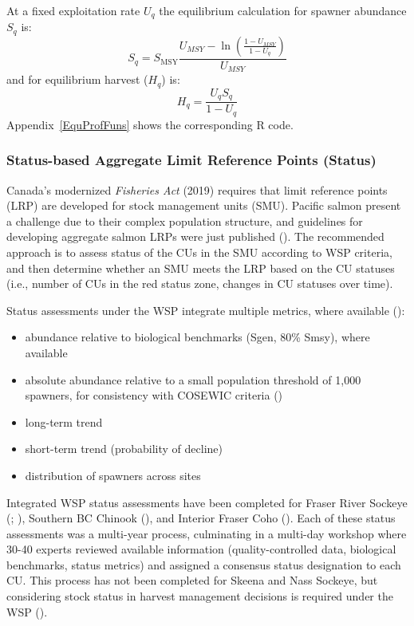 \documentclass[french,11pt]{book}
\begin{document}
At a fixed exploitation rate \(U_q\) the equilibrium calculation for spawner abundance \(S_{q}\) is:
\begin{equation}
S_{q} = S_{\mathrm{MSY}} \frac{U_{MSY} - \ln\left(\frac{1 - U_{MSY}}{1 - U_{q}}\right)}{U_{MSY}}
\end{equation}
and for equilibrium harvest (\(H_{q}\)) is:
\begin{equation}
H_{q} = \frac{U_{q}S_{q}}{1 - U_{q}}
\end{equation}
Appendix~\ref{EquProfFuns} shows the corresponding R code.

\subsubsection{Status-based Aggregate Limit Reference Points (Status)}\label{StatusMethods}

Canada's modernized \emph{Fisheries Act} (2019) requires that limit reference points (LRP) are developed for stock management units (SMU). Pacific salmon present a challenge due to their complex population structure, and guidelines for developing aggregate salmon LRPs were just published (). The recommended approach is to assess status of the CUs in the SMU according to WSP criteria, and then determine whether an SMU meets the LRP based on the CU statuses (i.e., number of CUs in the red status zone, changes in CU statuses over time).

Status assessments under the WSP integrate multiple metrics, where available ():
\begin{itemize}

\item
  abundance relative to biological benchmarks (Sgen, 80\% Smsy), where available
\item
  absolute abundance relative to a small population threshold of 1,000 spawners, for consistency with COSEWIC criteria ()
\item
  long-term trend
\item
  short-term trend (probability of decline)
\item
  distribution of spawners across sites
\end{itemize}
Integrated WSP status assessments have been completed for Fraser River Sockeye (; ), Southern BC Chinook (), and Interior Fraser Coho (). Each of these status assessments was a multi-year process, culminating in a multi-day workshop where 30-40 experts reviewed available information (quality-controlled data, biological benchmarks, status metrics) and assigned a consensus status designation to each CU. This process has not been completed for Skeena and Nass Sockeye, but considering stock status in harvest management decisions is required under the WSP ().
\end{document}
